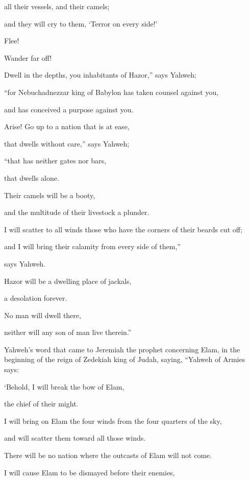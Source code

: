 {\par }{\QB all their vessels, and their camels;
\par }{\QB and they will cry to them, ‘Terror on every side!’
\par }{\Q {}Flee!
\par }{\QB Wander far off!
\par }{\Q Dwell in the depths, you inhabitants of Hazor,” says Yahweh;
\par }{\QB “for Nebuchadnezzar king of Babylon has taken counsel against you,
\par }{\QB and has conceived a purpose against you.
\par }{\Q {}Arise! Go up to a nation that is at ease,
\par }{\QB that dwells without care,” says Yahweh;
\par }{\QB “that has neither gates nor bars,
\par }{\QB that dwells alone.
\par }{\Q {}Their camels will be a booty,
\par }{\QB and the multitude of their livestock a plunder.
\par }{\Q I will scatter to all winds those who have the corners of their beards cut off;
\par }{\QB and I will bring their calamity from every side of them,”
\par }{\QB says Yahweh.
\par }{\Q {}Hazor will be a dwelling place of jackals,
\par }{\QB a desolation forever.
\par }{\Q No man will dwell there,
\par }{\QB neither will any son of man live therein.”
\par }{\BB \par }{\PP {}Yahweh’s word that came to Jeremiah the prophet concerning Elam, in the beginning of the reign of Zedekiah king of Judah, saying,
“Yahweh of Armies says:
\par }{\Q ‘Behold, I will break the bow of Elam,
\par }{\QB the chief of their might.
\par }{\Q {}I will bring on Elam the four winds from the four quarters of the sky,
\par }{\QB and will scatter them toward all those winds.
\par }{\QB There will be no nation where the outcasts of Elam will not come.
\par }{\Q {}I will cause Elam to be dismayed before their enemies,
}
